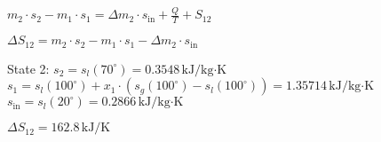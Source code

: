 \( m_2 \cdot s_2 - m_1 \cdot s_1 = \Delta m_2 \cdot s_{\text{in}} + \frac{Q}{T} + S_{12} \)  

\( \Delta S_{12} = m_2 \cdot s_2 - m_1 \cdot s_1 - \Delta m_2 \cdot s_{\text{in}} \)  

State 2:  
\( s_2 = s_l(70^\circ) = 0.3548 \, \text{kJ/kg·K} \)  
\( s_1 = s_l(100^\circ) + x_1 \cdot (s_g(100^\circ) - s_l(100^\circ)) = 1.35714 \, \text{kJ/kg·K} \)  
\( s_{\text{in}} = s_l(20^\circ) = 0.2866 \, \text{kJ/kg·K} \)  

\( \Delta S_{12} = 162.8 \, \text{kJ/K} \)